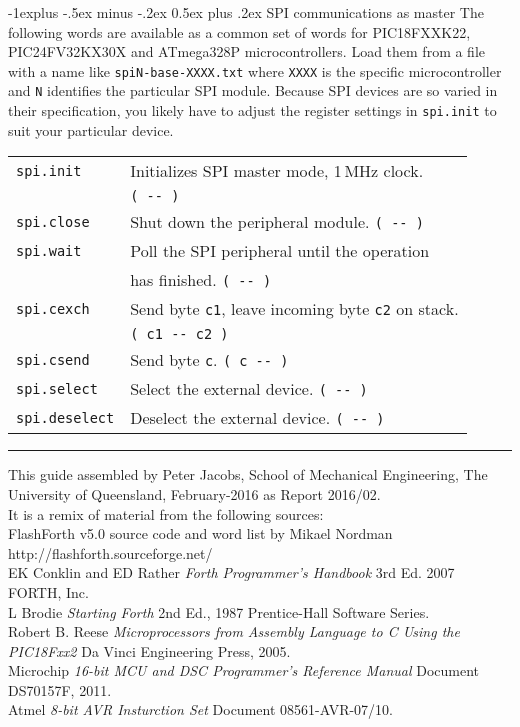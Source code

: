 \documentclass[10pt,landscape,a4paper]{article}
\makeatletter
\renewcommand{\subsection}{\@startsection{subsection}{2}{0mm}%
                                {-1explus -.5ex minus -.2ex}%
                                {0.5ex plus .2ex}%
                                {\normalfont\normalsize\bfseries}}
\makeatother
\begin{document}
\begin{multicols}{3}
\medskip

\subsection{SPI communications as master}
The following words are available as a common set of words for PIC18FXXK22, 
PIC24FV32KX30X and ATmega328P microcontrollers.
Load them from a file with a name like \verb!spiN-base-XXXX.txt! where \verb!XXXX!
is the specific microcontroller and \verb!N! identifies the particular SPI module.
Because SPI devices are so varied in their specification, you likely have to 
adjust the register settings in \verb!spi.init! to suit your particular device.
\begin{tabular}{@{}ll@{}}
\verb!spi.init!  & Initializes SPI master mode, 1\,MHz clock. \\
                 & \verb!( -- ) !\\
\verb!spi.close! & Shut down the peripheral module. \verb!( -- )! \\ 
\verb!spi.wait!  & Poll the SPI peripheral until the operation \\
                 & has finished. \verb!( -- )! \\
\verb!spi.cexch! & Send byte \verb!c1!, leave incoming byte \verb!c2! on stack. \\
                 & \verb!( c1 -- c2 )! \\
\verb!spi.csend! & Send byte \verb!c!. \verb!( c -- )! \\
\verb!spi.select! & Select the external device. \verb!( -- )! \\
\verb!spi.deselect! & Deselect the external device. \verb!( -- )! \\
\end{tabular}


\rule{0.3\linewidth}{0.25pt}
\scriptsize

This guide assembled by Peter Jacobs, School of Mechanical Engineering,
The University of Queensland, February-2016 as Report 2016/02. \\
It is a remix of material from the following sources:\\
FlashForth v5.0 source code and word list by Mikael Nordman \\
http://flashforth.sourceforge.net/ \\
EK Conklin and ED Rather \textit{Forth Programmer's Handbook} 3rd Ed. 2007 FORTH, Inc.\\
L Brodie \textit{Starting Forth} 2nd Ed., 1987 Prentice-Hall Software Series.\\
Robert B. Reese \textit{Microprocessors from Assembly Language to C 
Using the PIC18Fxx2} Da Vinci Engineering Press, 2005.\\
Microchip \textit{16-bit MCU and DSC Programmer’s Reference Manual} Document DS70157F, 2011.\\
Atmel \textit{8-bit AVR Insturction Set} Document 08561-AVR-07/10.\\

\end{multicols}
\end{document}
